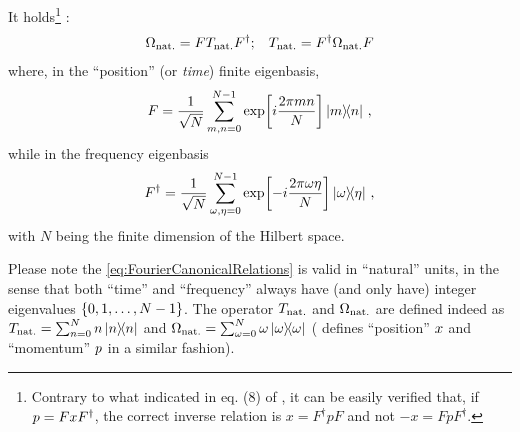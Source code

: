 It holds\footnote{
  Contrary to what indicated in eq. (8) of \cite{FiniteHilb},
  it can be easily verified that,
  if $ {p} = F x F^{\dagger} $,
  the correct inverse relation is
  $ x = F^{\dagger} p F$ and not $ -x = F p F^{\dagger} $.
} \parencite{FiniteHilb}:
\begin{gather}\label{eq:FourierCanonicalRelations}
  {\Omega}_{\mathrm{nat.}} = F {T}_{\mathrm{nat.}} F^{\dagger}\text{;} \quad
  {T}_{\mathrm{nat.}} = F^{\dagger} {\Omega}_{\mathrm{nat.}} F
\end{gather}
where, in the ``position'' (or \emph{time}) finite eigenbasis,
\begin{equation}
  F = \frac{1}{\sqrt{N}} \sum_{m,n=0}^{N-1} \exp[i\frac{2\pi mn}{N}] \ketbra{m}{n} \, \text{,}
\end{equation}
while in the frequency eigenbasis
\begin{equation}
  F^{\dagger} = \frac{1}{\sqrt{N}} \sum_{\omega,\eta=0}^{N-1} \exp[-i\frac{2\pi \omega\eta}{N}] \ketbra{\omega}{\eta} \, \text{,}
\end{equation}
with $N$ being the finite dimension of the Hilbert space.

Please note the \eqref{eq:FourierCanonicalRelations} is valid in ``natural'' units,
in the sense that
both ``time'' and ``frequency'' 
always have (and only have) integer eigenvalues $\left\{0, 1, \dots, N-1\right\}$.
The operator ${T}_{\mathrm{nat.}}$ and ${\Omega}_{\mathrm{nat.}}$ are defined indeed as
${T}_{\mathrm{nat.}} = \sum_{n=0}^{N} n \ketbra{n}$ and
${\Omega}_{\mathrm{nat.}} = \sum_{\omega=0}^{N} \omega \ketbra{\omega}$
(\citereset\cite{FiniteHilb} defines ``position'' ${x}$ and ``momentum'' ${p}$ in a similar fashion).

